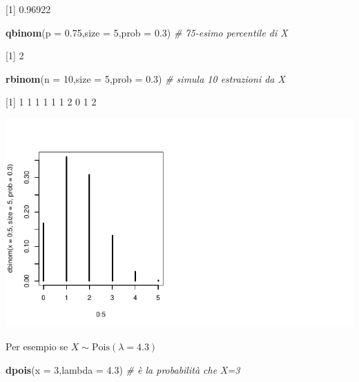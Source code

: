 \documentclass[
  11pt,
]{book}
\newenvironment{Shaded}{\begin{snugshade}}{\end{snugshade}}
\newcommand{\AttributeTok}[1]{\textcolor[rgb]{0.13,0.29,0.53}{#1}}
\newcommand{\CommentTok}[1]{\textcolor[rgb]{0.56,0.35,0.01}{\textit{#1}}}
\newcommand{\DecValTok}[1]{\textcolor[rgb]{0.00,0.00,0.81}{#1}}
\newcommand{\FloatTok}[1]{\textcolor[rgb]{0.00,0.00,0.81}{#1}}
\newcommand{\FunctionTok}[1]{\textcolor[rgb]{0.13,0.29,0.53}{\textbf{#1}}}
\newcommand{\NormalTok}[1]{#1}
\theoremstyle{mytheoremstyle}
\theoremstyle{mydefstyle}
\begin{document}
{[}1{]} 0.96922

\begin{Shaded}
\begin{Highlighting}[]
\FunctionTok{qbinom}\NormalTok{(}\AttributeTok{p =} \FloatTok{0.75}\NormalTok{,}\AttributeTok{size =} \DecValTok{5}\NormalTok{,}\AttributeTok{prob =} \FloatTok{0.3}\NormalTok{) }\CommentTok{\# 75{-}esimo percentile di X}
\end{Highlighting}
\end{Shaded}

{[}1{]} 2

\begin{Shaded}
\begin{Highlighting}[]
\FunctionTok{rbinom}\NormalTok{(}\AttributeTok{n =} \DecValTok{10}\NormalTok{,}\AttributeTok{size =} \DecValTok{5}\NormalTok{,}\AttributeTok{prob =} \FloatTok{0.3}\NormalTok{)  }\CommentTok{\# simula 10 estrazioni da X}
\end{Highlighting}
\end{Shaded}

{[}1{]} 1 1 1 1 1 1 2 0 1 2

\begin{center}\includegraphics{Appunti_di_Statistica_2025_files/figure-latex/24-Libro-40-1} \end{center}

Per esempio se \(X\sim\text{Pois}(\lambda=4.3)\)

\begin{Shaded}
\begin{Highlighting}[]
\FunctionTok{dpois}\NormalTok{(}\AttributeTok{x =} \DecValTok{3}\NormalTok{,}\AttributeTok{lambda =} \FloatTok{4.3}\NormalTok{) }\CommentTok{\# è la probabilità che X=3}
\end{Highlighting}
\end{Shaded}
\end{document}
